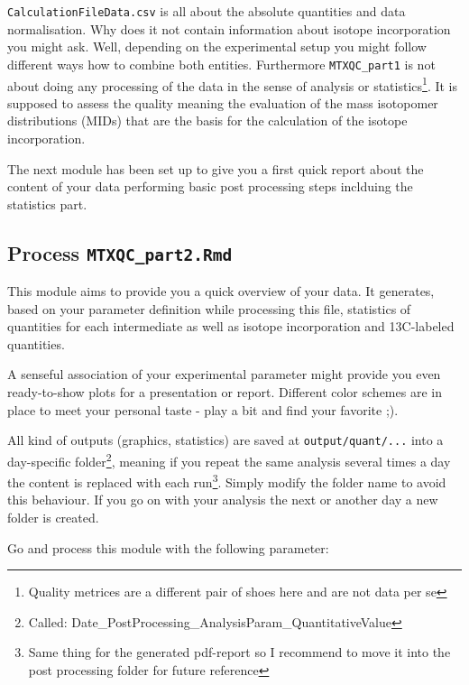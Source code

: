 \documentclass[]{book}
\let\rmarkdownfootnote\footnote%
\def\footnote{\protect\rmarkdownfootnote}
\theoremstyle{definition}
\theoremstyle{definition}
\theoremstyle{definition}
\theoremstyle{remark}
\begin{document}
\texttt{CalculationFileData.csv} is all about the absolute quantities
and data normalisation. Why does it not contain information about
isotope incorporation you might ask. Well, depending on the experimental
setup you might follow different ways how to combine both entities.
Furthermore \texttt{MTXQC\_part1} is not about doing any processing of
the data in the sense of analysis or statistics\footnote{Quality
  metrices are a different pair of shoes here and are not data per se}.
It is supposed to assess the quality meaning the evaluation of the mass
isotopomer distributions (MIDs) that are the basis for the calculation
of the isotope incorporation.

The next module has been set up to give you a first quick report about
the content of your data performing basic post processing steps
inclduing the statistics part.

\subsection{\texorpdfstring{Process
\texttt{MTXQC\_part2.Rmd}}{Process MTXQC\_part2.Rmd}}\label{process-mtxqc_part2.rmd}

This module aims to provide you a quick overview of your data. It
generates, based on your parameter definition while processing this
file, statistics of quantities for each intermediate as well as isotope
incorporation and 13C-labeled quantities.

A senseful association of your experimental parameter might provide you
even ready-to-show plots for a presentation or report. Different color
schemes are in place to meet your personal taste - play a bit and find
your favorite ;).

All kind of outputs (graphics, statistics) are saved at
\texttt{output/quant/...} into a day-specific folder\footnote{Called:
  Date\_PostProcessing\_AnalysisParam\_QuantitativeValue}, meaning if
you repeat the same analysis several times a day the content is replaced
with each run\footnote{Same thing for the generated pdf-report so I
  recommend to move it into the post processing folder for future
  reference}. Simply modify the folder name to avoid this behaviour. If
you go on with your analysis the next or another day a new folder is
created.

Go and process this module with the following parameter:
\end{document}
